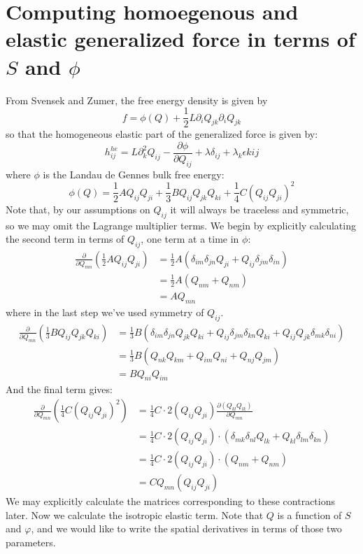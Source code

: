 \documentclass[leqno]{article}
\begin{document}
	\section*{Computing homoegenous and elastic generalized force in terms of $S$ and $\phi$}
	From Svensek and Zumer, the free energy density is given by
	\[
		f = \phi(Q) + \frac{1}{2} L \partial_i Q_{jk} \partial_i Q_{jk}
	\]
	so that the homogeneous elastic part of the generalized force is given by:
	\[
		h^{he}_{ij} = L\partial_k^2 Q_{ij} - \frac{\partial \phi}{\partial Q_{ij}} + \lambda \delta_{ij} + \lambda_k\epsilon{kij}
	\]
	where $\phi$ is the Landau de Gennes bulk free energy:
	\[
		\phi(Q) = \frac{1}{2}A Q_{ij}Q_{ji} + \frac{1}{3}B Q_{ij}Q_{jk}Q_{ki} + \frac{1}{4} C(Q_{ij}Q_{ji})^2
	\]
	Note that, by our assumptions on $Q_{ij}$ it will always be traceless and symmetric, so we may omit the Lagrange multiplier terms. We begin by explicitly calculating the second term in terms of $Q_{ij}$, one term at a time in $\phi$:
	\begin{align*}
		\frac{\partial}{\partial Q_{mn}}\left(\frac{1}{2}AQ_{ij}Q_{ji}\right) &= \frac{1}{2}A \left(\delta_{im}\delta_{jn}Q_{ji} + Q_{ij}\delta_{jm}\delta_{in}\right) \\
		&= \frac{1}{2}A (Q_{nm} + Q_{nm}) \\
		&= A Q_{mn}
	\end{align*}
	where in the last step we've used symmetry of $Q_{ij}$.
	\begin{align*}
		\frac{\partial}{\partial Q_{mn}} \left( \frac{1}{3}BQ_{ij}Q_{jk}Q_{ki} \right) &= \frac{1}{3}B ( \delta_{im}\delta_{jn}Q_{jk}Q_{ki} + Q_{ij}\delta_{jm}\delta_{kn}Q_{ki} + Q_{ij}Q_{jk}\delta_{mk}\delta_{ni} ) \\
		&= \frac{1}{3}B(Q_{nk}Q_{km} + Q_{im}Q_{ni} + Q_{nj}Q_{jm}) \\
		&= BQ_{ni}Q_{im}
	\end{align*}
	And the final term gives:
	\begin{align*}
		\frac{\partial}{\partial Q_{mn}}\left( \frac{1}{4} C(Q_{ij}Q_{ji})^2 \right) &= \frac{1}{4}C \cdot 2(Q_{ij}Q_{ji}) \frac{\partial(Q_{kl}Q_{lk})}{\partial Q_{mn}} \\
		&= \frac{1}{4}C \cdot 2(Q_{ij}Q_{ji}) \cdot (\delta_{mk}\delta_{nl}Q_{lk} + Q_{kl}\delta_{lm}\delta_{kn}) \\
		&= \frac{1}{4}C \cdot 2(Q_{ij}Q_{ji}) \cdot (Q_{nm} + Q_{nm}) \\
		&= C Q_{mn} (Q_{ij}Q_{ji})
	\end{align*}
	We may explicitly calculate the matrices corresponding to these contractions later. Now we calculate the isotropic elastic term. Note that $Q$ is a function of $S$ and $\varphi$, and we would like to write the spatial derivatives in terms of those two parameters. 
\end{document}
